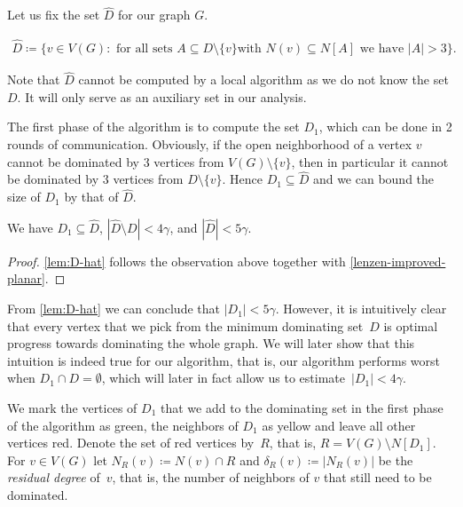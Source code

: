 Let us fix the set $\hat{D}$ for our graph $G$.
\begin{tcolorbox}
\vspace{-4mm}
    \begin{align*}
      \hat D\coloneqq \{v\in V(G) : \text{ for all sets } A\subseteq D\setminus \{v\}
      & \text{ with $N(v)\subseteq N[A]$} \text{ we have $|A|>3\}$.}
  \end{align*}
\end{tcolorbox}
\smallskip

Note that $\hat{D}$ cannot be computed by a local algorithm as we do
not know the set $D$. It will only serve as an auxiliary set in our
analysis.

\smallskip The first phase of the algorithm is to compute the set
$D_1$, which can be done in 2 rounds of communication. Obviously, if
the open neighborhood of a vertex $v$ cannot be dominated by $3$
vertices from $V(G)\setminus\{v\}$, then in particular it cannot be
dominated by $3$ vertices from $D\setminus\{v\}$.  Hence
$D_1\subseteq \hat{D}$ and we can bound the size of $D_1$ by that of
$\hat{D}$.

\smallskip
\begin{lemma}\label{lem:D-hat}
  We have $D_1\subseteq \hat D$, $|\hat{D}\setminus D|< 4\gamma$, and
  $|\hat{D}|< 5\gamma$.
\end{lemma}
\begin{proof}
  \cref{lem:D-hat} follows the observation above together with
  \cref{lenzen-improved-planar}.
\end{proof}

From \cref{lem:D-hat} we can conclude that $|D_1|< 5\gamma$. However,
it is intuitively clear that every vertex that we pick from the
minimum dominating set~$D$ is optimal progress towards dominating the
whole graph. We will later show that this intuition is indeed true for
our algorithm, that is, our algorithm performs worst when
$D_1\cap D=\emptyset$, which will later in fact allow us to
estimate~$|D_1|<4\gamma$.

\smallskip

We mark the vertices of $D_1$ that we add to the dominating set in the
first phase of the algorithm as green, the neighbors of $D_1$ as
yellow and leave all other vertices red. Denote the set of red
vertices by~$R$, that is, $R=V(G)\setminus N[D_1]$.  For $v\in V(G)$
let $N_R(v)\coloneqq N(v)\cap R$ and $\delta_R(v)\coloneqq |N_R(v)|$
be the \emph{residual degree} of~$v$, that is, the number of neighbors
of $v$ that still need to be dominated.


